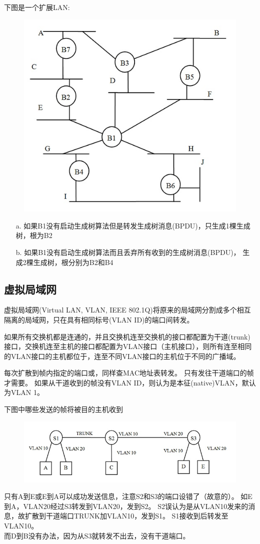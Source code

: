\begin{example}
	下图是一个扩展LAN:
	\begin{figure}[H]
		\centering
		\includegraphics[width=0.4\linewidth]{fig/spanning_tree.jpg}
	\end{figure}
\end{example}
\begin{analysis}
	\begin{itemize}
		\item[a.] 如果B1没有启动生成树算法但是转发生成树消息(BPDU)，只生成1棵生成树，根为B2
		\item[b.] 如果B1没有启动生成树算法而且丢弃所有收到的生成树消息(BPDU)，
		生成2棵生成树，根分别为B2和B4
	\end{itemize}
\end{analysis}

\subsection{虚拟局域网}
虚拟局域网(Virtual LAN, VLAN, IEEE 802.1Q)将原来的局域网分割成多个相互隔离的局域网，只在具有相同标号(VLAN ID)的端口间转发。

如果所有交换机都是连通的，并且交换机连至交换机的接口都配置为干道(trunk)接口，交换机连至主机的接口都配置为VLAN接口（主机接口），则所有连至相同的VLAN接口的主机都位于，连至不同VLAN接口的主机位于不同的广播域。

每次扩散到帧内指定的端口或，同样查MAC地址表转发。
只有发往干道端口的帧才需要。
如果从干道收到的帧没有VLAN ID，则认为是本征(native)VLAN，默认为VLAN 1。
\begin{example}
	下图中哪些发送的帧将被目的主机收到
	\begin{figure}[H]
		\centering
		\includegraphics[width=0.6\linewidth]{fig/vlan.jpg}
	\end{figure}
\end{example}
\begin{analysis}
	只有A到E或E到A可以成功发送信息，注意S2和S3的端口设错了（故意的）。
	如E到A，VLAN20经过S3转发到VLAN20，发到S2。
	S2误认为是从VLAN10发来的消息，故扩散到干道端口TRUNK加VLAN10，发到S1。
	S1接收到后转发至VLAN10。\\
	而D到B没有办法，因为从S3就转发不出去，没有干道端口。
\end{analysis}


